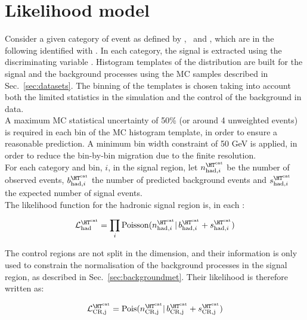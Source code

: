 \section{Likelihood model}
\label{sec:likelihood}

Consider a given category of event as defined by \njet, \nb~and \scalht, which are in the following identified with \htcat. 
In each category, the signal is extracted using the discriminating variable \mht. 
Histogram templates of the \mht distribution are built for the signal and the background processes 
using the MC samples described in Sec.~\ref{sec:datasets}. 
The binning of the templates is chosen taking into account both the limited statistics in the simulation and 
the control of the background in data. \\
A maximum MC statistical uncertainty of 50\% (or around 4 unweighted events) is required in each bin of the MC histogram template, 
in order to ensure a reasonable prediction. A minimum bin width constraint of 50 GeV is applied, 
in order to reduce the bin-by-bin migration due to the finite \mht resolution.\\


For each category \htcat and \mht bin, $i$, in the signal region, let $n^{\htcat}_{\mathrm{had},i}$ be the number of observed events, 
$b^{\htcat}_{\mathrm{had},i}$ the number of predicted background events and $s^{\htcat}_{\mathrm{had},i}$ the expected number of signal events. \\
The likelihood function for the hadronic signal region is, in each \htcat:

\begin{equation}
\mathcal{L}^{\htcat}_{\mathrm{had}}=\prod_i \mathrm{Poisson}(n^{\htcat}_{\mathrm{had},i} |\, b^{\htcat}_{\mathrm{had},i} + s^{\htcat}_{\mathrm{had},i})
\label{eq:hadronicLikelihood}
\end{equation}

The control regions are not split in the \mht dimension, and their information is only used to constrain the normalisation of the background processes 
in the signal region, as described in Sec.~\ref{sec:backgroundmet}. 
Their likelihood is therefore written as:

\begin{equation}
\mathcal{L}^{\htcat}_{\mathrm{CR,j}}=\mathrm{Pois}(n^{\htcat}_{\mathrm{CR,j}} |\, b^{\htcat}_{\mathrm{CR,j}} + s^{\htcat}_{\mathrm{CR,j}})
\label{eq:controlLikelihood}
\end{equation}

